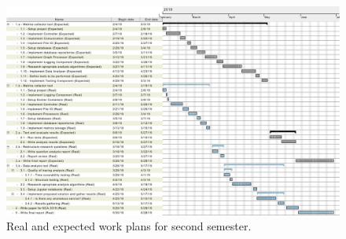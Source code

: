 \begin{landscape}
    \begin{figure}
        \includegraphics[height=1.0\textheight]{images/complete_work_plan_semester_2.pdf}
        \caption{Real and expected work plans for second semester.}
        \label{fig:complete_work_plan_semester_2}
    \end{figure}
\end{landscape}

\checkoddpage
{}
{
    \newpage
    \blankpage
}
{
}